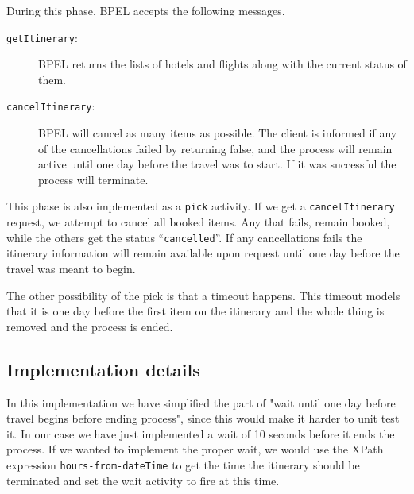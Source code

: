 \noindent
During this phase, BPEL accepts the following messages.

\begin{description}
\item [\texttt{getItinerary}:] BPEL returns the lists of hotels and flights along with the current status of them.
\item [\texttt{cancelItinerary}:] BPEL will cancel as many items as possible. The client is informed if any of the cancellations failed by returning false, and the process will remain active until one day before the travel was to start. If it was successful the process will terminate.
\end{description}

This phase is also implemented as a \texttt{pick} activity. If we get a \texttt{cancelItinerary} request, we attempt to cancel all booked items. Any that fails, remain booked, while the others get the status ``\texttt{cancelled}''. If any cancellations fails the itinerary information will remain available upon request until one day before the travel was meant to begin. 

The other possibility of the pick is that a timeout happens. This timeout models that it is one day before the first item on the itinerary and the whole thing is removed and the process is ended.


\subsection{Implementation details}
\kim

\noindent
In this implementation we have simplified the part of "wait until one day before travel begins before ending process", since this would make it harder to unit test it. In our case we have just implemented a wait of 10 seconds before it ends the process. If we wanted to implement the proper wait, we would use the XPath expression \texttt{hours-from-dateTime} to get the time the itinerary should be terminated and set the wait activity to fire at this time.
